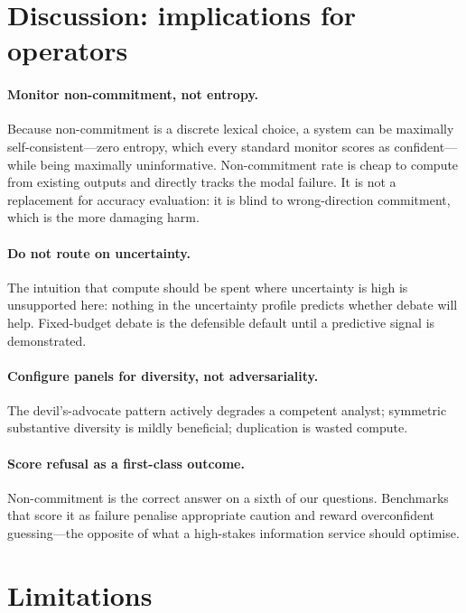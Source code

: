 \documentclass[sigconf,anonymous,review]{acmart}
\begin{document}
\section{Discussion: implications for operators}

\paragraph{Monitor non-commitment, not entropy.} Because non-commitment is a
discrete lexical choice, a system can be maximally self-consistent---zero
entropy, which every standard monitor scores as confident---while being
maximally uninformative. Non-commitment rate is cheap to compute from
existing outputs and directly tracks the modal failure. It is not a
replacement for accuracy evaluation: it is blind to wrong-direction
commitment, which is the more damaging harm.

\paragraph{Do not route on uncertainty.} The intuition that compute should be
spent where uncertainty is high is unsupported here: nothing in the
uncertainty profile predicts whether debate will help. Fixed-budget debate is
the defensible default until a predictive signal is demonstrated.

\paragraph{Configure panels for diversity, not adversariality.} The
devil's-advocate pattern actively degrades a competent analyst; symmetric
substantive diversity is mildly beneficial; duplication is wasted compute.

\paragraph{Score refusal as a first-class outcome.} Non-commitment is the
correct answer on a sixth of our questions. Benchmarks that score it as
failure penalise appropriate caution and reward overconfident guessing---the
opposite of what a high-stakes information service should optimise.

\section{Limitations}
\end{document}
